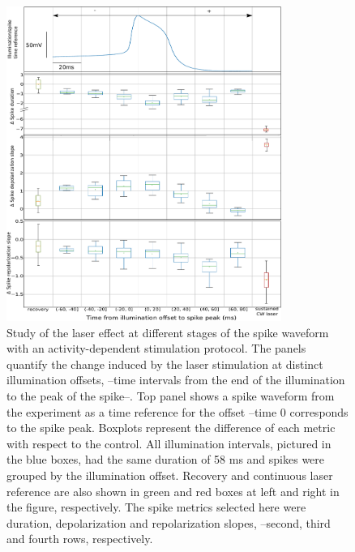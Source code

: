 \begin{figure}[htb!]
	\centering
	\includegraphics[width=0.8\textwidth]{img/laser/Figure6.pdf}
	\caption{Study of the laser effect at different stages of the spike waveform with an activity-dependent stimulation protocol. The panels quantify the change induced by the laser stimulation at distinct illumination offsets, --time intervals from the end of the illumination to the peak of the spike--. Top panel shows a spike waveform from the experiment as a time reference for the offset --time 0 corresponds to the spike peak. Boxplots represent the difference of each metric with respect to the control. All illumination intervals, pictured in the blue boxes, had the same duration of 58 ms and spikes were grouped by the illumination offset. Recovery and continuous laser reference are also shown in green and red boxes at left and right in the figure, respectively. The spike metrics selected here were duration, depolarization and repolarization slopes, --second, third and fourth rows, respectively.}
	\label{fig:activity dependent}
\end{figure}

